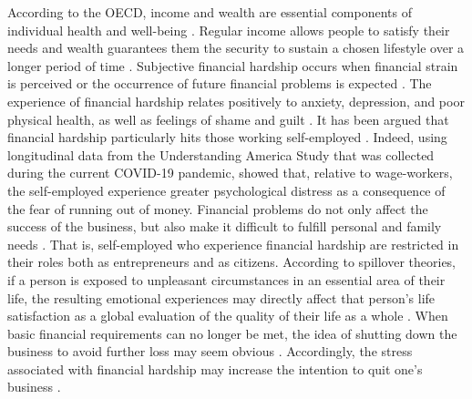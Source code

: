 \documentclass[man]{apa7}
\begin{document}
According to the OECD, income and wealth are essential components of individual health and well-being \parencite{OECD2013}.
Regular income allows people to satisfy their needs and wealth guarantees them the security to sustain a chosen lifestyle over a longer period of time \parencite{OECD2013}.  
Subjective financial hardship occurs when financial strain is perceived or the occurrence of future financial problems is expected \parencite[see][]{Schieman2011}.
The experience of financial hardship relates positively to anxiety, depression, and poor physical health, as well as feelings of shame and guilt \parencite[e.g.,][]{OECD2013, Kahn2006, McDaid2013, Peirce1994, Starrin2009}.  
It has been argued that financial hardship particularly hits those working self-employed \parencite[e.g.,][]{Patel2020a}. 
Indeed, using longitudinal data from the Understanding America Study that was collected during the current COVID-19 pandemic, \textcite{Patel2020a} showed that, relative to wage-workers, the self-employed experience greater psychological distress as a consequence of the fear of running out of money.
Financial problems do not only affect the success of the business, but also make it difficult to fulfill personal and family needs \parencite[e.g., paying off mortgages,][]{Gorgievski2010a}. 
That is, self-employed who experience financial hardship are restricted in their roles both as entrepreneurs and as citizens. 
According to spillover theories, if a person is exposed to unpleasant circumstances in an essential area of their life, the resulting emotional experiences may directly affect that person's life satisfaction as a global evaluation of the quality of their life as a whole \parencite{McDowell2010, Pavot2009, Kantak1992, Pasupuleti2009}.
When basic financial requirements can no longer be met, the idea of shutting down the business to avoid further loss may seem obvious \parencite{Gorgievski2010a}.
Accordingly, the stress associated with financial hardship may increase the intention to quit one's business \parencite[e.g.,][]{Annink2016, Gorgievski2010a}. \par 
\end{document}
